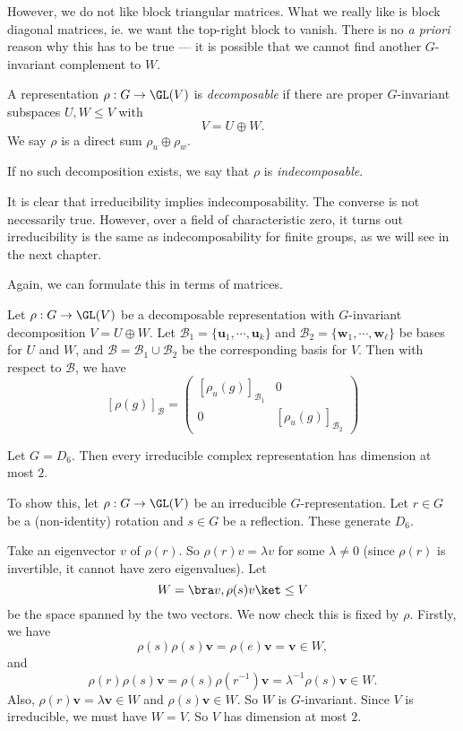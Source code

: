 \documentclass[a4paper]{article}
\begin{document}
However, we do not like block triangular matrices. What we really like is block diagonal matrices, ie. we want the top-right block to vanish. There is no \emph{a priori} reason why this has to be true --- it is possible that we cannot find another $G$-invariant complement to $W$.

\begin{defi}
  A representation $\rho: G \to \GL(V)$ is \emph{decomposable} if there are proper $G$-invariant subspaces $U, W \leq V$ with
  \[
    V = U \oplus W.
  \]
  We say $\rho$ is a direct sum $\rho_u \oplus \rho_w$.

  If no such decomposition exists, we say that $\rho$ is \emph{indecomposable}.
\end{defi}
It is clear that irreducibility implies indecomposability. The converse is not necessarily true. However, over a field of characteristic zero, it turns out irreducibility is the same as indecomposability for finite groups, as we will see in the next chapter.

Again, we can formulate this in terms of matrices.
\begin{lemma}
  Let $\rho: G \to \GL(V)$ be a decomposable representation with $G$-invariant decomposition $V = U \oplus W$. Let $\mathcal{B}_1 = \{\mathbf{u}_1, \cdots, \mathbf{u}_k\}$ and $\mathcal{B}_2 = \{\mathbf{w}_1, \cdots, \mathbf{w}_\ell\}$ be bases for $U$ and $W$, and $\mathcal{B} = \mathcal{B}_1 \cup \mathcal{B}_2$ be the corresponding basis for $V$. Then with respect to $\mathcal{B}$, we have
  \[
    [\rho(g)]_{\mathcal{B}} =
    \begin{pmatrix}
      [\rho_u(g)]_{\mathcal{B}_1} & 0\\
      0 & [\rho_u (g)]_{\mathcal{B}_2}
    \end{pmatrix}
  \]
\end{lemma}

\begin{eg}
  Let $G = D_6$. Then every irreducible complex representation has dimension at most $2$.

  To show this, let $\rho: G \to \GL(V)$ be an irreducible $G$-representation. Let $r \in G$ be a (non-identity) rotation and $s\in G$ be a reflection. These generate $D_6$.

  Take an eigenvector $v$ of $\rho(r)$. So $\rho(r) v = \lambda v$ for some $\lambda \not= 0$ (since $\rho(r)$ is invertible, it cannot have zero eigenvalues). Let
  \[
    W = \bra v, \rho(s) v\ket \leq V
  \]
  be the space spanned by the two vectors. We now check this is fixed by $\rho$. Firstly, we have
  \[
    \rho(s)\rho(s) \mathbf{v} = \rho(e) \mathbf{v} = \mathbf{v} \in W,
  \]
  and
  \[
    \rho(r)\rho(s) \mathbf{v} = \rho(s) \rho(r^{-1}) \mathbf{v} = \lambda^{-1} \rho(s) \mathbf{v} \in W.
  \]
  Also, $\rho(r) \mathbf{v} = \lambda \mathbf{v} \in W$ and $\rho(s) \mathbf{v} \in W$. So $W$ is $G$-invariant. Since $V$ is irreducible, we must have $W = V$. So $V$ has dimension at most $2$.
\end{eg}
\end{document}
